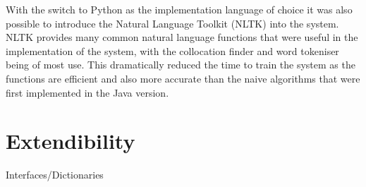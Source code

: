 With the switch to Python as the implementation language of choice it was also possible to introduce the Natural Language Toolkit (NLTK) \cite{} into the system. NLTK provides many common natural language functions that were useful in the implementation of the system, with the collocation finder and word tokeniser being of most use. This dramatically reduced the time to train the system as the functions are efficient and also more accurate than the naive algorithms that were first implemented in the Java version.

\section{Extendibility}
Interfaces/Dictionaries
